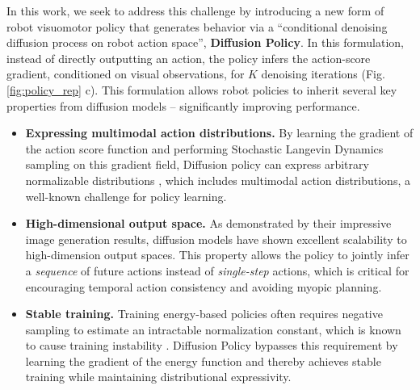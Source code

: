 \documentclass[Afour,sageh,times]{sagej}
\begin{document}
In this work, we seek to address this challenge by introducing a new form of robot visuomotor policy that generates behavior via a ``conditional denoising diffusion process \cite{ho2020denoising} on robot action space'', \textbf{Diffusion Policy}. In this formulation, instead of directly outputting an action, the policy infers the action-score gradient, conditioned on visual observations, for $K$ denoising iterations (Fig. \ref{fig:policy_rep} c). 
This formulation allows robot policies to inherit several key properties from diffusion models -- significantly improving performance.
\begin{itemize} %
    
    \item \textbf{Expressing multimodal action distributions.} 
     By learning the gradient of the action score function \cite{song2019score} and performing Stochastic Langevin Dynamics sampling on this gradient field, Diffusion policy can express arbitrary normalizable distributions \cite{neal2011mcmc}, which includes multimodal action distributions, a well-known challenge for policy learning.

    \item \textbf{High-dimensional output space.} As demonstrated by their impressive image generation results, diffusion models have shown excellent scalability to high-dimension output spaces. This property allows the policy to jointly infer a \textit{sequence} of future actions instead of \textit{single-step} actions, which is critical for encouraging temporal action consistency and avoiding myopic planning.  
    
    \item \textbf{Stable training.} 
    Training energy-based policies often requires negative sampling to estimate an intractable normalization constant, which is known to cause training instability \cite{du2020improved,ibc}. Diffusion Policy bypasses this requirement by learning the gradient of the energy function and thereby achieves stable training while maintaining distributional expressivity. %

\end{itemize}
\end{document}
